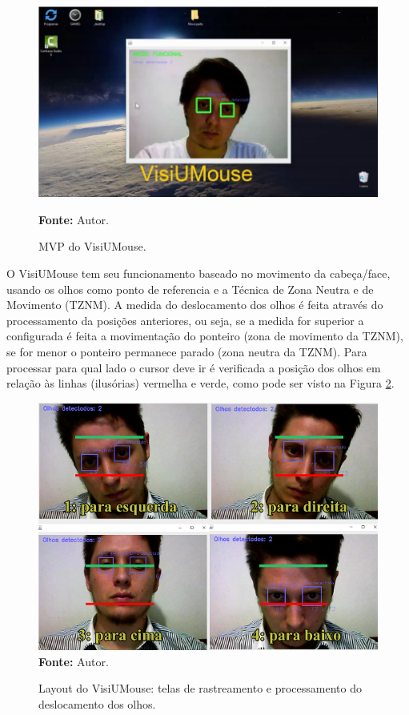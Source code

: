 \begin{figure}[htbp]
\centering
\caption{MVP do VisiUMouse.}
\includegraphics[scale=.6]{img/visiumouse-1.png}

  \textbf{Fonte:} Autor.
\label{fig:visiumouse-1}
\end{figure}

O VisiUMouse tem seu funcionamento baseado no movimento da cabeça/face, usando os olhos como ponto de referencia e a Técnica de Zona Neutra e de Movimento (TZNM). A medida do deslocamento dos olhos é feita através do processamento da posições anteriores, ou seja, se a medida for superior a configurada é feita a movimentação do ponteiro (zona de movimento da TZNM), se for menor o ponteiro permanece parado (zona neutra da TZNM). Para processar para qual lado o cursor deve ir é verificada a posição dos olhos em relação às linhas (ilusórias) vermelha e verde, como pode ser visto na Figura \ref{fig:funcionamento}.

\begin{figure}[htbp]
\caption{Layout do VisiUMouse: telas de rastreamento e processamento do deslocamento dos olhos.}
\centering \includegraphics[scale=1]{img/funcionamento2.png}
\textbf{Fonte:} Autor.
\label{fig:funcionamento}
\end{figure}

